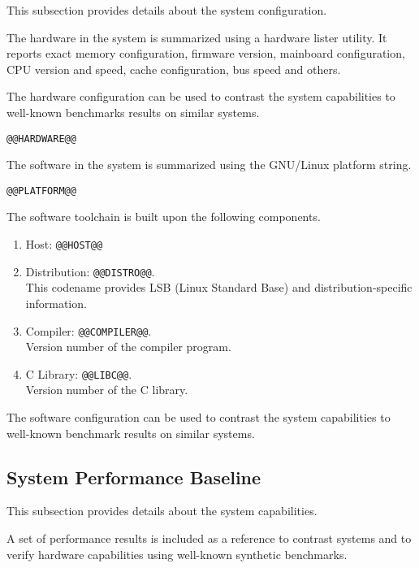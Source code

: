 \documentclass[a4paper]{article}
\begin{document}
This subsection provides details about the system configuration.

The hardware in the system is summarized using a hardware lister utility.
It reports exact memory configuration, firmware version, mainboard configuration, CPU version and speed, cache configuration, bus speed and others.

\smallskip

The hardware configuration can be used to contrast the system capabilities to well-known benchmarks results on similar systems.

\begin{verbatim}
@@HARDWARE@@
\end{verbatim}

The software in the system is summarized using the GNU/Linux platform string.

\begin{verbatim}
@@PLATFORM@@
\end{verbatim}

The software toolchain is built upon the following components.

\begin{enumerate}
\item Host: {\tt @@HOST@@}
\item Distribution: {\tt @@DISTRO@@}. \\This codename provides LSB (Linux Standard Base) and distribution-specific information.
\item Compiler: {\tt @@COMPILER@@}. \\Version number of the compiler program.
\item C Library: {\tt @@LIBC@@}. \\Version number of the C library.
\end{enumerate}

\smallskip

The software configuration can be used to contrast the system capabilities to well-known benchmark results on similar systems.

\subsection{System Performance Baseline}

This subsection provides details about the system capabilities.

\smallskip

A set of performance results is included as a reference to contrast systems and to verify hardware capabilities using well-known synthetic benchmarks.
\end{document}
